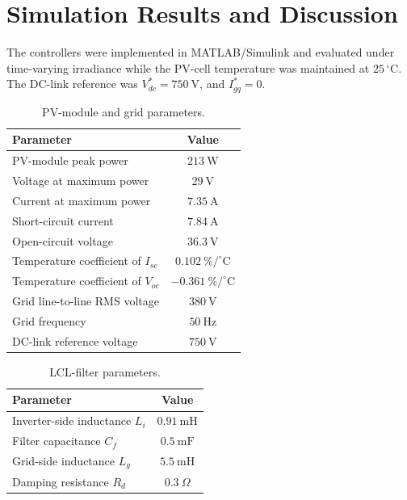 \documentclass[preprint,12pt]{elsarticle}
\begin{document}
\section{Simulation Results and Discussion}
\label{sec:results}

The controllers were implemented in MATLAB/Simulink and evaluated under time-varying irradiance while the PV-cell temperature was maintained at $25\,^{\circ}\mathrm{C}$. The DC-link reference was $V_{dc}^{*}=750~\mathrm{V}$, and $I_{gq}^{*}=0$.

\begin{table}[htbp]
\centering
\caption{PV-module and grid parameters.}
\label{tab:system-params}
\begin{tabular}{lc}
\toprule
Parameter & Value\\
\midrule
PV-module peak power & $213~\mathrm{W}$\\
Voltage at maximum power & $29~\mathrm{V}$\\
Current at maximum power & $7.35~\mathrm{A}$\\
Short-circuit current & $7.84~\mathrm{A}$\\
Open-circuit voltage & $36.3~\mathrm{V}$\\
Temperature coefficient of $I_{sc}$ & $0.102~\%/^{\circ}\mathrm{C}$\\
Temperature coefficient of $V_{oc}$ & $-0.361~\%/^{\circ}\mathrm{C}$\\
Grid line-to-line RMS voltage & $380~\mathrm{V}$\\
Grid frequency & $50~\mathrm{Hz}$\\
DC-link reference voltage & $750~\mathrm{V}$\\
\bottomrule
\end{tabular}
\end{table}

\begin{table}[htbp]
\centering
\caption{LCL-filter parameters.}
\label{tab:lcl-params}
\begin{tabular}{lc}
\toprule
Parameter & Value\\
\midrule
Inverter-side inductance $L_i$ & $0.91~\mathrm{mH}$\\
Filter capacitance $C_f$ & $0.5~\mathrm{mF}$\\
Grid-side inductance $L_g$ & $5.5~\mathrm{mH}$\\
Damping resistance $R_d$ & $0.3~\Omega$\\
\bottomrule
\end{tabular}
\end{table}
\end{document}
